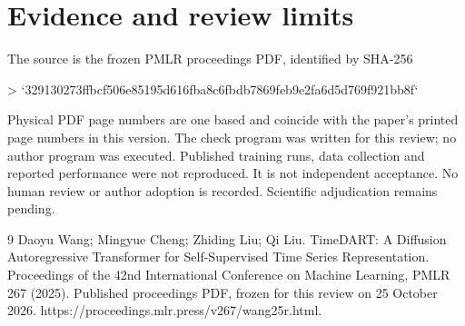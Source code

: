 \documentclass[10pt]{article}
\begin{document}
\section*{Evidence and review limits}
The source is the frozen PMLR proceedings PDF, identified by SHA-256\par
> `329130273ffbcf506e85195d616fba8c6fbdb7869feb9e2fa6d5d769f921bb8f`\par
Physical PDF page numbers are one based and coincide with the paper’s printed page numbers in this version. The check program was written for this review; no author program was executed. Published training runs, data collection and reported performance were not reproduced. It is not independent acceptance. No human review or author adoption is recorded. Scientific adjudication remains pending.\par
9 Daoyu Wang; Mingyue Cheng; Zhiding Liu; Qi Liu. TimeDART: A Diffusion Autoregressive Transformer for Self-Supervised Time Series Representation. Proceedings of the 42nd International Conference on Machine Learning, PMLR 267 (2025). Published proceedings PDF, frozen for this review on 25 October 2026. https://proceedings.mlr.press/v267/wang25r.html.\par
\end{document}
